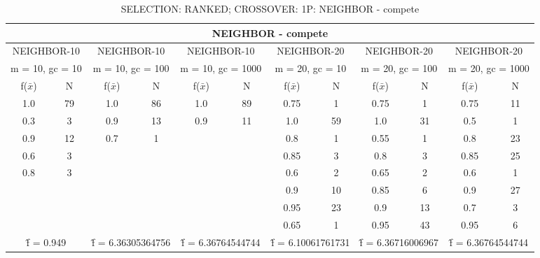 \begin{table}[H]
	\centering
	\caption{SELECTION: RANKED; CROSSOVER: 1P: NEIGHBOR - compete}
	\begin{adjustbox}{width=1\textwidth}
		\begin{tabular}{ |c|c||c|c||c|c||c|c||c|c||c|c| }
			\hline
			\multicolumn{12}{|c|}{NEIGHBOR - compete} \\
			\hline
			\multicolumn{2}{|c||}{NEIGHBOR-10} & \multicolumn{2}{c||}{NEIGHBOR-10} & \multicolumn{2}{c||}{NEIGHBOR-10} & \multicolumn{2}{c||}{NEIGHBOR-20} & \multicolumn{2}{c||}{NEIGHBOR-20} & \multicolumn{2}{c|}{NEIGHBOR-20}\\
			\hline
			\multicolumn{2}{|c||}{m = 10, gc = 10} & \multicolumn{2}{c||}{m = 10, gc = 100} & \multicolumn{2}{c||}{m = 10, gc = 1000} & \multicolumn{2}{c||}{m = 20, gc = 10} & \multicolumn{2}{c||}{m = 20, gc = 100} & \multicolumn{2}{c|}{m = 20, gc = 1000}\\
			\hline
			f($\bar{x}$) & N & f($\bar{x}$) & N & f($\bar{x}$) & N & f($\bar{x}$) & N & f($\bar{x}$) & N & f($\bar{x}$) & N\\
			\hline
			\hline
			1.0 & 79 & 1.0 & 86 & 1.0 & 89 & 0.75 & 1 & 0.75 & 1 & 0.75 & 11\\
			0.3 & 3 & 0.9 & 13 & 0.9 & 11 & 1.0 & 59 & 1.0 & 31 & 0.5 & 1\\
			0.9 & 12 & 0.7 & 1 &   &   & 0.8 & 1 & 0.55 & 1 & 0.8 & 23\\
			0.6 & 3 &   &   &   &   & 0.85 & 3 & 0.8 & 3 & 0.85 & 25\\
			0.8 & 3 &   &   &   &   & 0.6 & 2 & 0.65 & 2 & 0.6 & 1\\
			&   &   &   &   &   & 0.9 & 10 & 0.85 & 6 & 0.9 & 27\\
			&   &   &   &   &   & 0.95 & 23 & 0.9 & 13 & 0.7 & 3\\
			&   &   &   &   &   & 0.65 & 1 & 0.95 & 43 & 0.95 & 6\\
			\hline
			\multicolumn{2}{|c||}{\^{f} = 0.949} & \multicolumn{2}{c||}{\^{f} = 6.36305364756} & \multicolumn{2}{c||}{\^{f} = 6.36764544744} & \multicolumn{2}{c||}{\^{f} = 6.10061761731} & \multicolumn{2}{c||}{\^{f} = 6.36716006967} & \multicolumn{2}{c|}{\^{f} = 6.36764544744}\\
			\hline
		\end{tabular}
	\end{adjustbox}
\end{table}
